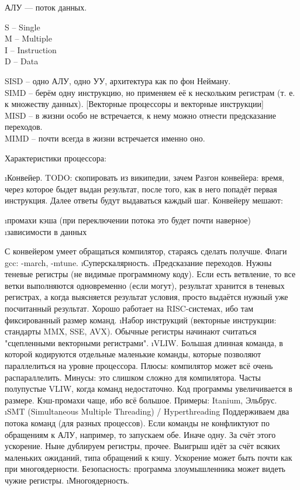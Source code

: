  АЛУ --- поток данных.
 
 S -- Single\\
 M -- Multiple\\ 
 I -- Instruction\\
 D -- Data
 
 SISD -- одно АЛУ, одно УУ, архитектура как по фон Нейману.\\
 SIMD -- берём одну инструкцию, но применяем её к нескольким регистрам (т. е. к множеству данных). [Векторные процессоры и векторные инструкции]\\
 MISD -- в жизни особо не встречается, к нему можно отнести предсказание переходов.\\
 MIMD -- почти всегда в жизни встречается именно оно.
 
 Характеристики процессора:
 \begin{enumerate}
  \i  Конвейер.
   TODO: скопировать из википедии, зачем
   Разгон конвейера: время, через которое быдет выдан результат, после того, как в него попадёт первая инструкция. Далее ответы будут выдаваться каждый шаг.
   Конвейеру мешают: 
    \begin{enumerate}
   	 \i промахи кэша (при переключении потока это будет почти наверное)
	 \i зависимости в данных
    \end{enumerate}
   С конвейером умеет обращаться компилятор, стараясь сделать получше. Флаги gcc: -march, -mtune.
  \i Суперскалярность.
  \i Предсказание переходов. Нужны теневые регистры (не видимые программному коду). Если есть ветвление, то все ветки выполняются одновременно (если могут), результат хранится в теневых регистрах, а когда выясняется результат условия, просто выдаётся нужный уже посчитанный результат.
   Хорошо работает на RISC-системах, ибо там фиксированный размер команд.
 \i Набор инструкций (векторные инструкции: стандарты MMX, SSE, AVX).
  Обычные регистры начинают считаться "сцепленными векторными регистрами".
 \i VLIW. Большая длинная команда, в которой кодируются отдельные маленькие команды, которые позволяют параллелиться на уровне процессора. Плюсы: компилятор может всё очень распараллелить.
  Минусы: это слишком сложно для компилятора. Часты полупустые VLIW, когда команд недостаточно. Код программы увеличивается в размере. Кэш-промахи чаще, ибо всё большое. Примеры: Itanium, Эльбрус.
 \i SMT (Simultaneous Multiple Threading) / Hyperthreading
  Поддерживаем два потока команд (для разных процессов). Если команды не конфликтуют по обращениям к АЛУ, например, то запускаем обе. Иначе одну. За счёт этого ускорение.
  Ныне дублируем регистры, прочее. Выигрыш идёт за счёт всяких маленьких ожиданий, типа обращений к кэшу. Ускорение может быть почти как при многоядерности.
  Безопасность: программа злоумышленника может видеть чужие регистры.
 \i Многоядерность.
 \end{enumerate}

